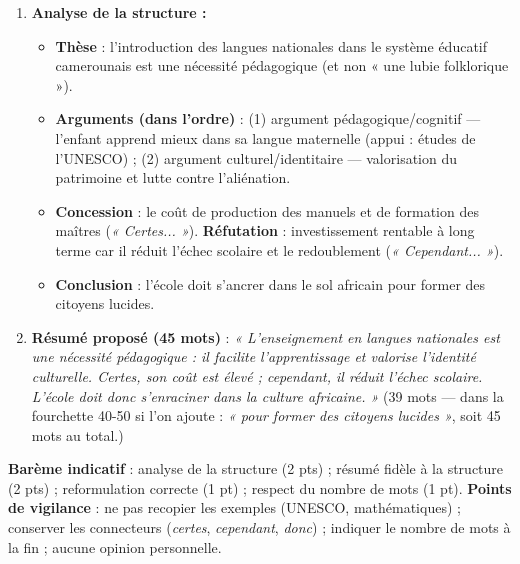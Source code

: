 \documentclass[11pt]{article}
\begin{document}
\begin{corrige}
\begin{enumerate}
    \item \textbf{Analyse de la structure :}
\begin{itemize}
    \item \textbf{Thèse} : l'introduction des langues nationales dans le système éducatif camerounais est une nécessité pédagogique (et non « une lubie folklorique »).
    \item \textbf{Arguments (dans l'ordre)} : (1) argument pédagogique/cognitif — l'enfant apprend mieux dans sa langue maternelle (appui : études de l'UNESCO) ; (2) argument culturel/identitaire — valorisation du patrimoine et lutte contre l'aliénation.
    \item \textbf{Concession} : le coût de production des manuels et de formation des maîtres (\emph{« Certes... »}). \textbf{Réfutation} : investissement rentable à long terme car il réduit l'échec scolaire et le redoublement (\emph{« Cependant... »}).
    \item \textbf{Conclusion} : l'école doit s'ancrer dans le sol africain pour former des citoyens lucides.
\end{itemize}
    \item \textbf{Résumé proposé (45 mots)} :
\emph{« L'enseignement en langues nationales est une nécessité pédagogique : il facilite l'apprentissage et valorise l'identité culturelle. Certes, son coût est élevé ; cependant, il réduit l'échec scolaire. L'école doit donc s'enraciner dans la culture africaine. »} (39 mots — dans la fourchette 40-50 si l'on ajoute : \emph{« pour former des citoyens lucides »}, soit 45 mots au total.)
\end{enumerate}
\textbf{Barème indicatif} : analyse de la structure (2 pts) ; résumé fidèle à la structure (2 pts) ; reformulation correcte (1 pt) ; respect du nombre de mots (1 pt).
\textbf{Points de vigilance} : ne pas recopier les exemples (UNESCO, mathématiques) ; conserver les connecteurs (\emph{certes}, \emph{cependant}, \emph{donc}) ; indiquer le nombre de mots à la fin ; aucune opinion personnelle.
\end{corrige}
\end{document}
